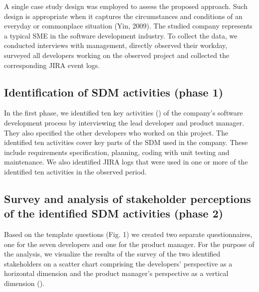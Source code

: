 A single case study design was employed to assess the proposed approach. Such design is appropriate when it captures the circumstances and conditions of an everyday or commonplace situation (Yin, 2009). The studied company represents a typical SME in the software development industry. To collect the data, we conducted interviews with management, directly observed their workday, surveyed all developers working on the observed project and collected the corresponding JIRA event logs.

\subsection{Identification of SDM activities (phase 1)}
In the first phase, we identified ten key activities () of the company’s software development process by interviewing the lead developer and product manager.  They also specified the other developers who worked on this project. The identified ten activities cover key parts of the SDM used in the company. These include requirements specification, planning, coding with unit testing and maintenance. We also identified JIRA logs that were used in one or more of the identified ten activities in the observed period.



\subsection{Survey and analysis of stakeholder perceptions of the identified SDM activities (phase 2)}
Based on the template questions (Fig. 1) we created two separate questionnaires, one for the seven developers and one for the product manager. For the purpose of the analysis, we visualize the results of the survey of the two identified stakeholders on a scatter chart comprising the developers’ perspective as a horizontal dimension and the product manager’s perspective as a vertical dimension ().

